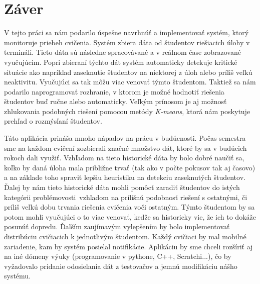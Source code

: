 \chapter*{Záver}  %

V tejto práci sa nám podarilo úspešne navrhnúť a implementovať systém, ktorý monitoruje
priebeh cvičenia. Systém zbiera dáta od študentov riešiacich úlohy v termináli.
Tieto dáta sú následne spracovávané a v reálnom čase zobrazované vyučujúcim.
Popri zbieraní týchto dát systém automaticky detekuje kritické situácie ako napríklad
zaseknutie študentov na niektorej z úloh alebo príliš veľkú neaktivitu. Vyučujúci
sa tak môžu viac venovať týmto študentom. Taktiež sa nám podarilo naprogramovať
rozhranie, v ktorom je možné hodnotiť riešenia študentov buď ručne alebo automaticky.
Veľkým prínosom je aj možnosť zhlukovania podobných riešení pomocou metódy
\textit{K-means}, ktorá nám poskytuje prehľad o rozmýsľaní študentov.

Táto aplikácia prináša mnoho nápadov na prácu v budúcnosti. Počas semestra
sme na každom cvičení zozbierali značné množstvo dát, ktoré by sa v budúcich rokoch
dali využiť.
Vzhľadom na tieto historické dáta by bolo dobré naučiť sa, koľko by daná úloha mala
približne trvať (tak ako v počte pokusov tak aj časovo) a na základe toho spraviť lepšiu
heuristiku na detekciu zaseknutých študentov.
Ďalej by nám tieto historické dáta mohli pomôcť zaradiť študentov do istých
\glqq kategórii problémovosti\grqq~vzhľadom na prílišnú podobnosť riešení s ostatnými,
či príliš veľkú dobu trvania riešenia cvičenia voči ostatným. Týmto študentom by sa
potom mohli vyučujúci o to viac venovať, kedže sa historicky vie, že ich to dokáže
posunúť dopredu. Ďalším zaujímavým vylepšením by bolo implementovať distribúciu cvičiacich
k jednotlivým
študentom. Každý cvičiaci by mal mobilné zariadenie, kam by systém posielal
notifikácie. Aplikáciu by sme chceli rozšíriť aj na iné dómeny výuky
(programovanie v pythone, C++, Scratchi...), čo by vyžadovalo pridanie odosielania
dát z testovačov a jemnú modifikáciu nášho systému.





